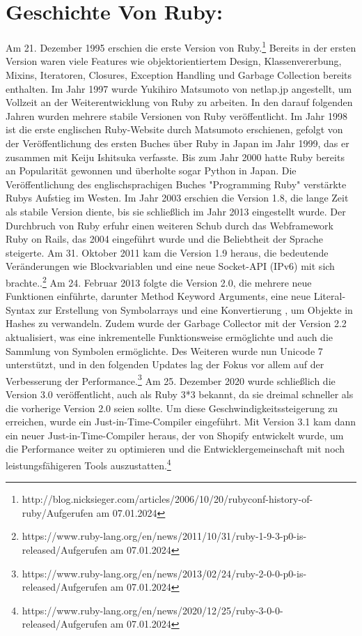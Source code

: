 \documentclass{article}
\begin{document}
\section*{Geschichte Von Ruby:}
Am 21. Dezember 1995 erschien die erste Version von Ruby.\footnote{http://blog.nicksieger.com/articles/2006/10/20/rubyconf-history-of-ruby/\label{rubyh}Aufgerufen am 07.01.2024} Bereits in der ersten Version waren viele Features wie objektorientiertem Design, Klassenvererbung, Mixins, Iteratoren, Closures, Exception Handling und Garbage Collection bereits enthalten. Im Jahr 1997 wurde Yukihiro Matsumoto von netlap.jp angestellt, um Vollzeit an der Weiterentwicklung von Ruby zu arbeiten. In den darauf folgenden Jahren wurden mehrere stabile Versionen von Ruby veröffentlicht.
Im Jahr 1998 ist die erste englischen Ruby-Website durch Matsumoto erschienen, gefolgt von der Veröffentlichung des ersten Buches über Ruby in Japan im Jahr 1999, das er zusammen mit Keiju Ishitsuka verfasste. Bis zum Jahr 2000 hatte Ruby bereits an Popularität gewonnen und überholte sogar Python in Japan. Die Veröffentlichung des englischsprachigen Buches "Programming Ruby" verstärkte Rubys Aufstieg im Westen.
Im Jahr 2003 erschien die Version 1.8, die lange Zeit als stabile Version diente, bis sie schließlich im Jahr 2013 eingestellt wurde. Der Durchbruch von Ruby erfuhr einen weiteren Schub durch das Webframework Ruby on Rails, das 2004 eingeführt wurde und die Beliebtheit der Sprache steigerte.
Am 31. Oktober 2011 kam die Version 1.9 heraus, die bedeutende Veränderungen wie Blockvariablen und eine neue Socket-API (IPv6) mit sich brachte..\footnote{https://www.ruby-lang.org/en/news/2011/10/31/ruby-1-9-3-p0-is-released/Aufgerufen am 07.01.2024} Am 24. Februar 2013 folgte die Version 2.0, die mehrere neue Funktionen einführte, darunter Method Keyword Arguments, eine neue Literal-Syntax zur Erstellung von Symbolarrays und eine Konvertierung , um Objekte in Hashes zu verwandeln. Zudem wurde der Garbage Collector mit der Version 2.2 aktualisiert, was eine inkrementelle Funktionsweise ermöglichte und auch die Sammlung von Symbolen ermöglichte. Des Weiteren wurde nun Unicode 7 unterstützt, und in den folgenden Updates lag der Fokus vor allem auf der Verbesserung der Performance.\footnote{https://www.ruby-lang.org/en/news/2013/02/24/ruby-2-0-0-p0-is-released/Aufgerufen am 07.01.2024}
Am 25. Dezember 2020 wurde schließlich die Version 3.0 veröffentlicht, auch als Ruby 3*3 bekannt, da sie dreimal schneller als die vorherige Version 2.0 seien sollte. Um diese Geschwindigkeitssteigerung zu erreichen, wurde ein Just-in-Time-Compiler eingeführt. Mit Version 3.1 kam dann ein neuer Just-in-Time-Compiler heraus, der von Shopify entwickelt wurde, um die Performance weiter zu optimieren und die Entwicklergemeinschaft mit noch leistungsfähigeren Tools auszustatten.\footnote{https://www.ruby-lang.org/en/news/2020/12/25/ruby-3-0-0-released/Aufgerufen am 07.01.2024}
\end{document}
